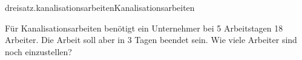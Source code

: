 \begin{exercise}{dreisatz.kanalisationsarbeiten}{Kanalisationsarbeiten}
  \ifproblem\problem\par
    Für Kanalisationsarbeiten benötigt ein Unternehmer bei 5 Arbeitstagen 18
    Arbeiter. Die Arbeit soll aber in 3 Tagen beendet sein. Wie viele Arbeiter
    sind noch einzustellen?
  \fi
\end{exercise}

